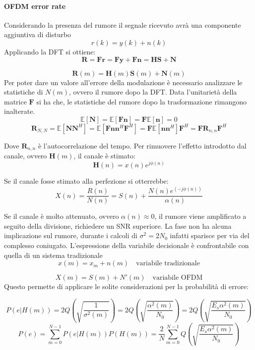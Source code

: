 \paragraph*{OFDM error rate}
Considerando la presenza del rumore il segnale ricevuto avrà una componente aggiuntiva di disturbo
\[
    r(k) = y(k) + n(k)  
\]
Applicando la DFT si ottiene:
\[
    \mathbf{R} = \mathbf{F}\mathbf{r} = \mathbf{F}\mathbf{y} + \mathbf{F}\mathbf{n} = \mathbf{H}\mathbf{S} + \mathbf{N}
\]

\[
    \mathbf{R}(m) = \mathbf{H}(m)\mathbf{S}(m) + \mathbf{N}(m)
\]
Per poter dare un valore all'errore della modulazione è necessario analizzare le statistiche di $N(m)$, ovvero il rumore dopo la DFT.
Data l'unitarietà della matrice $\mathbf{F}$ si ha che, le statistiche del rumore dopo la trasformazione rimangono inalterate.
\[
    \mathbb{E}[\mathbf{N}] = \mathbb{E}[\mathbf{F}\mathbf{n}] = \mathbf{F} \mathbb{E}[\mathbf{n}] = 0
\]  
\[
    \mathbf{R}_{N,N} = \mathbb{E}[\mathbf{N}\mathbf{N}^H] = \mathbb{E}[\mathbf{F}\mathbf{n}\mathbf{n}^H\mathbf{F}^H] = \mathbf{F}\mathbb{E}[\mathbf{n}\mathbf{n}^H]\mathbf{F}^H = \mathbf{F}\mathbf{R}_{n,n}\mathbf{F}^H
\]

Dove $\mathbf{R}_{n,n}$ è l'autocorrelazione del tempo.
Per rimuovere l'effetto introdotto dal canale, ovvero $\mathbf{H}(m)$, il canale è stimato:
\[
    \mathbf{H}(n) = x(n) e^{j\phi(n)}
\]

Se il canale fosse stimato alla perfezione si otterrebbe:
\[
    X(n) = \frac{R(n)}{N(n)} = S(n) + \frac{N(n)e^(-j\phi(n))}{\alpha(n)}
\]


Se il canale è molto attenuato, ovvero $\alpha(n) \approx 0$, il rumore viene amplificato a seguito della divisione, richiedere un SNR superiore.
La fase non ha alcuna implicazione sul rumore, durante i calcoli di $\sigma ^2=2N_0$ infatti sparisce per via del complesso coniugato.
L'espressione della variabile decisionale è confrontabile con quella di un sistema tradizionale
\[
    x(m) = x_m + n(m) \quad \text{variabile tradizionale}
\]

\[
    X(m) = S(m) + N'(m) \quad \text{variabile OFDM}
\]
Questo permette di applicare le solite considerazioni per la probabilità di errore:

\[
    P(e|H(m)) = 2 Q\left( \sqrt{\frac{1}{\sigma^2(m)}}  \right) =  2 Q\left( \sqrt{\frac{\alpha^2(m)}{N_0}}  \right) = 2 Q\left( \sqrt{\frac{E_s \alpha^2(m)}{N_0}}  \right) 
\]
\[
    P(e) = \sum_{m=0}^{N-1} P(e|H(m))P(H(m)) = \frac{2}{N} \sum_{m=0}^{N-1} Q\left( \sqrt{\frac{E_s \alpha^2(m)}{N_0}}  \right)
\]




